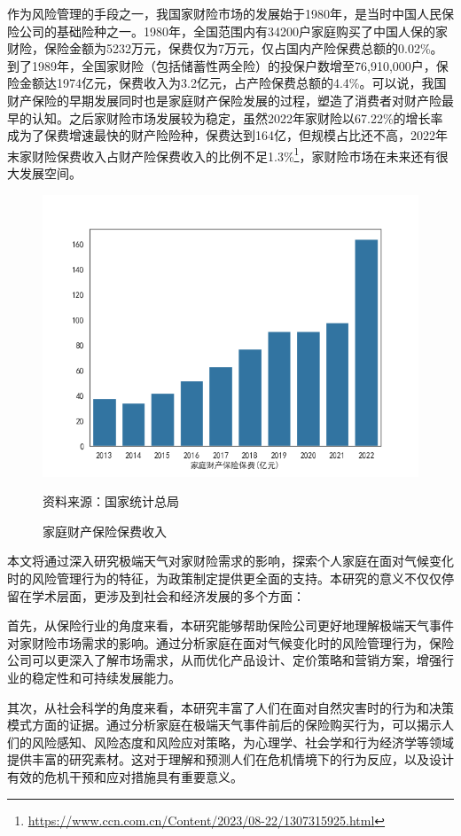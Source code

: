 作为风险管理的手段之一，我国家财险市场的发展始于1980年，是当时中国人民保险公司的基础险种之一。1980年，全国范围内有34200户家庭购买了中国人保的家财险，保险金额为5232万元，保费仅为7万元，仅占国内产险保费总额的0.02\%。到了1989年，全国家财险（包括储蓄性两全险）的投保户数增至76,910,000户，保险金额达1974亿元，保费收入为3.2亿元，占产险保费总额的4.4\%。可以说，我国财产保险的早期发展同时也是家庭财产保险发展的过程\citep{黄英君2008论我国产险公司分散性业务营销模式的创新}，塑造了消费者对财产险最早的认知。之后家财险市场发展较为稳定，虽然2022年家财险以67.22\%的增长率成为了保费增速最快的财产险险种，保费达到164亿，但规模占比还不高，2022年末家财险保费收入占财产险保费收入的比例不足1.3\%\footnote{\url{https://www.ccn.com.cn/Content/2023/08-22/1307315925.html}}，家财险市场在未来还有很大发展空间。
\begin{figure}[htbp]
    {\centering
    \includegraphics[width=0.8\linewidth]{img/家庭财产保险保费.png}\par }
    \caption{家庭财产保险保费收入}
    资料来源：国家统计总局\protect\footnotemark
\end{figure}

本文将通过深入研究极端天气对家财险需求的影响，探索个人家庭在面对气候变化时的风险管理行为的特征，为政策制定提供更全面的支持。本研究的意义不仅仅停留在学术层面，更涉及到社会和经济发展的多个方面：

首先，从保险行业的角度来看，本研究能够帮助保险公司更好地理解极端天气事件对家财险市场需求的影响。通过分析家庭在面对气候变化时的风险管理行为，保险公司可以更深入了解市场需求，从而优化产品设计、定价策略和营销方案，增强行业的稳定性和可持续发展能力。

其次，从社会科学的角度来看，本研究丰富了人们在面对自然灾害时的行为和决策模式方面的证据。通过分析家庭在极端天气事件前后的保险购买行为，可以揭示人们的风险感知、风险态度和风险应对策略，为心理学、社会学和行为经济学等领域提供丰富的研究素材。这对于理解和预测人们在危机情境下的行为反应，以及设计有效的危机干预和应对措施具有重要意义。

